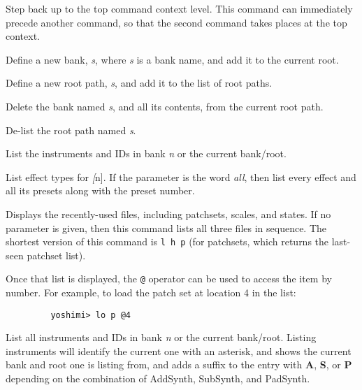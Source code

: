       Step back up to the top command context level.
      This command can immediately precede another command, so that the second
      command takes places at the top context.

      Define a new bank, \textsl{s}, where \textsl{s} is a bank name,
      and add it to the current root.

      Define a new root path, \textsl{s}, and add it to the list of root paths.

      Delete the bank named \textsl{s}, and all its contents,
      from the current root path.

      De-list the root path named \textsl{s}.

      List the instruments and IDs in bank \textsl{n} or the
      current bank/root.

      List effect types for \textsl[n].
      If the parameter is the word \textsl{all},
      then list every effect and all its
      presets along with the preset number.

      Displays the recently-used files, including patchsets, scales, and
      states.  If no parameter is given, then this command lists all three
      files in sequence.  The shortest version of this command is
      \texttt{l h p} (for patchsets, which returns the last-seen patchset list).

      Once that list is displayed,
      the \texttt{@} operator can be used to access
      the item by number.  For example, to load the patch set at location 4 in
      the list:

      \begin{verbatim}
         yoshimi> lo p @4
      \end{verbatim}

      List all instruments and IDs in bank \textsl{n}
      or the current bank/root.
      Listing instruments will identify the current one with an asterisk, and
      shows the current bank and root one is listing from, and adds a suffix to
      the entry with \textbf{A}, \textbf{S}, or \textbf{P}
      depending on the combination of AddSynth, SubSynth, and PadSynth.

